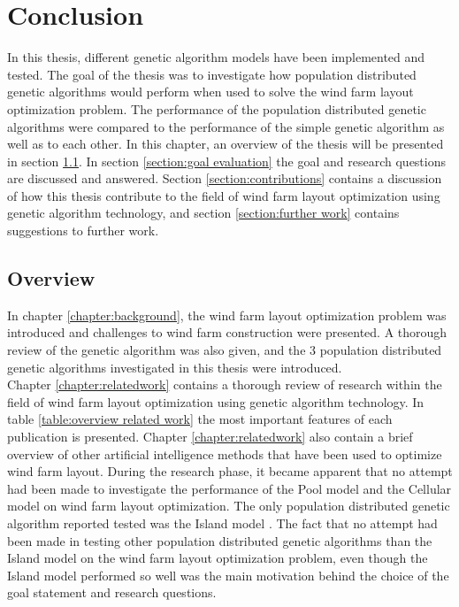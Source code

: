 \chapter{Conclusion}\label{chapter:conclusion}


\noindent In this thesis, different genetic algorithm models have been implemented and tested. The goal of the thesis was to investigate how population distributed genetic algorithms would perform when used to solve the wind farm layout optimization problem. The performance of the population distributed genetic algorithms were compared to the performance of the simple genetic algorithm as well as to each other. In this chapter, an overview of the thesis will be presented in section \ref{section:overview}. In section \ref{section:goal evaluation} the goal and research questions are discussed and answered. Section \ref{section:contributions} contains a discussion of how this thesis contribute to the field of wind farm layout optimization using genetic algorithm technology, and section \ref{section:further work} contains suggestions to further work.\\


\section{Overview}\label{section:overview}


\noindent In chapter \ref{chapter:background}, the wind farm layout optimization problem was introduced and challenges to wind farm construction were presented. A thorough review of the genetic algorithm was also given, and the 3 population distributed genetic algorithms investigated in this thesis were introduced.\\


\noindent Chapter \ref{chapter:relatedwork} contains a thorough review of research within the field of wind farm layout optimization using genetic algorithm technology. In table \ref{table:overview related work} the most important features of each publication is presented. Chapter \ref{chapter:relatedwork} also contain a brief overview of other artificial intelligence methods that have been used to optimize wind farm layout. During the research phase, it became apparent that no attempt had been made to investigate the performance of the Pool model and the Cellular model on wind farm layout optimization. The only population distributed genetic algorithm reported tested was the Island model \citep{Grady, Huang, Wan, Sisbot, Gao}. The fact that no attempt had been made in testing other population distributed genetic algorithms than the Island model on the wind farm layout optimization problem, even though the Island model performed so well was the main motivation behind the choice of the goal statement and research questions.\\ 



